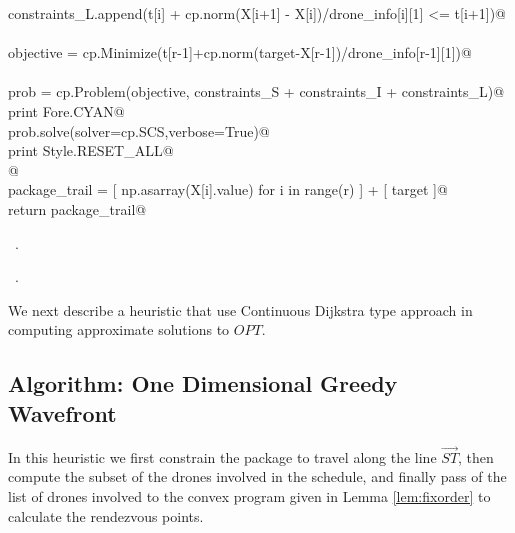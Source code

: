 \documentclass[10pt, english, oneside]{report}
\begin{document}
\begin{flushleft}
\begin{minipage}{\linewidth}
\begin{list}{}{}
\mbox{}\verb@      constraints_L.append(t[i] + cp.norm(X[i+1] - X[i])/drone_info[i][1] <= t[i+1])@\\
\mbox{}\verb@@\\
\mbox{}\verb@    objective = cp.Minimize(t[r-1]+cp.norm(target-X[r-1])/drone_info[r-1][1])@\\
\mbox{}\verb@@\\
\mbox{}\verb@    prob = cp.Problem(objective, constraints_S + constraints_I + constraints_L)@\\
\mbox{}\verb@    print Fore.CYAN@\\
\mbox{}\verb@    prob.solve(solver=cp.SCS,verbose=True)@\\
\mbox{}\verb@    print Style.RESET_ALL@\\
\mbox{}\verb@    @\\
\mbox{}\verb@    package_trail = [ np.asarray(X[i].value) for i in range(r) ] + [ target ]@\\
\mbox{}\verb@    return package_trail@\\
\mbox{}\verb@@{\NWsep}
\end{list}
\vspace{-1.5ex}
\footnotesize
\begin{list}{}{\setlength{\itemsep}{-\parsep}\setlength{\itemindent}{-\leftmargin}}
\item \NWtxtMacroDefBy\ .
\item \NWtxtMacroRefIn\ .

\item{}
\end{list}
\end{minipage}\vspace{4ex}
\end{flushleft}


We next describe a heuristic that use Continuous Dijkstra \cite{mitchell2000geometric} 
type approach in computing approximate solutions to $OPT$.

\subsection{Algorithm: One Dimensional Greedy Wavefront}
\label{ssec:odw}

In this heuristic we first constrain the package to travel along the line $\vec{ST}$, then compute the 
subset of the drones involved in the schedule, and finally pass of the list of drones involved to the convex
program given in Lemma \autoref{lem:fixorder} to calculate the rendezvous points. 
\end{document}
